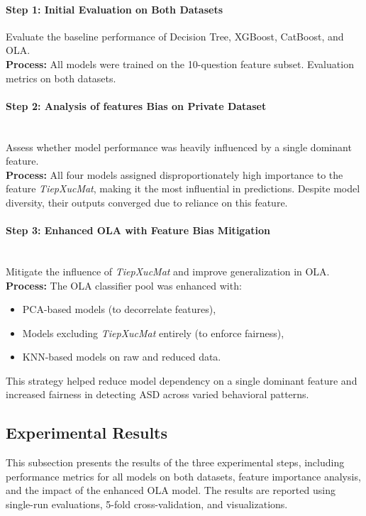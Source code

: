 \documentclass[conference]{IEEEtran}
\begin{document}
\paragraph{\textbf{Step 1: Initial Evaluation on Both Datasets}}

Evaluate the baseline performance of Decision Tree, XGBoost, CatBoost, and OLA.\\
\textbf{Process:} All models were trained on the 10-question feature subset. Evaluation metrics on both datasets.

\paragraph{\textbf{Step 2: Analysis of features Bias on Private Dataset}}\\

Assess whether model performance was heavily influenced by a single dominant feature.\\
\textbf{Process:} All four models assigned disproportionately high importance to the feature \textit{TiepXucMat}, making it the most influential in predictions. Despite model diversity, their outputs converged due to reliance on this feature.

\paragraph{\textbf{Step 3: Enhanced OLA with Feature Bias Mitigation}}\\

Mitigate the influence of \textit{TiepXucMat} and improve generalization in OLA.\\
\textbf{Process:} The OLA classifier pool was enhanced with:
\begin{itemize}
\item PCA-based models (to decorrelate features),
\item Models excluding \textit{TiepXucMat} entirely (to enforce fairness),
\item KNN-based models on raw and reduced data.
\end{itemize}
This strategy helped reduce model dependency on a single dominant feature and increased fairness in detecting ASD across varied behavioral patterns.


\onecolumn
\subsection{Experimental Results}
This subsection presents the results of the three experimental steps, including performance metrics for all models on both datasets, feature importance analysis, and the impact of the enhanced OLA model. The results are reported using single-run evaluations, 5-fold cross-validation, and visualizations.
\end{document}
